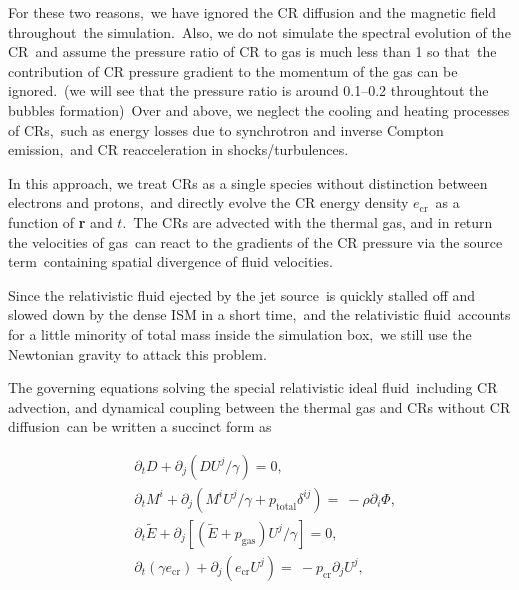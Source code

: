 \documentclass[fleqn,usenatbib,useAMS]{mnras}
\begin{document}
  For these two reasons,\
  we have ignored the CR diffusion and the magnetic field throughout\
  the simulation.\
  Also, we do not simulate the spectral evolution of the CR\
  and assume the pressure ratio of CR to gas is much less than 1 so that\
  the contribution of CR pressure gradient to the momentum of the gas can be ignored.\
  (we will see that the pressure ratio is around 0.1--0.2 throughtout the bubbles formation)\
  Over and above, we neglect the cooling and heating processes of CRs,\
  such as energy losses due to synchrotron and inverse Compton emission,\
  and CR reacceleration in shocks/turbulences.

  In this approach, we treat CRs as a single species without distinction between electrons and protons,\
  and directly evolve the CR energy density $e_{\text{cr}}$\
  as a function of \textbf{r} and $t$.\
  The CRs are advected with the thermal gas, and in return the velocities of gas\
  can react to the gradients of the CR pressure via the source term\
  containing spatial divergence of fluid velocities.


  Since the relativistic fluid ejected by the jet source\
  is quickly stalled off and slowed down by the dense ISM in a short time,\
  and the relativistic fluid\
  accounts for a little minority of total mass inside the simulation box,\
  we still use the Newtonian gravity to attack this problem.

  The governing equations solving the special relativistic ideal fluid\
  including CR advection, and dynamical coupling between the thermal gas and CRs without CR diffusion\
  can be written a succinct form as


  \begin{subequations}
    \label{governing-eq}
    \begin{align}
     &\partial_{t} D+\partial_{j} \left(DU^{j}/\gamma\right)=0,\label{D evolution}\\
     &\partial_{t} M^{i}+\partial_{j} \left(M^{i}U^{j}/\gamma+p_{\text{total}}\delta^{ij}\right)=\
     -\rho\partial_{i}\Phi,\label{M evolution}\\
     &\partial_{t} \tilde{E}+\partial_j \left[\left(\tilde{E}+p_{\text{gas}}\right)U^{j}/\gamma\right]=0, \label{E evoltion}\\
     &\partial_{t} \left(\gamma e_{\text{cr}}\right) + \partial_{j} \left(e_{\text{cr}}U^{j}\right)=\
     -p_{\text{cr}} \partial_{j} U^{j},\label{E evolution}
    \end{align}
  \end{subequations}
\end{document}
